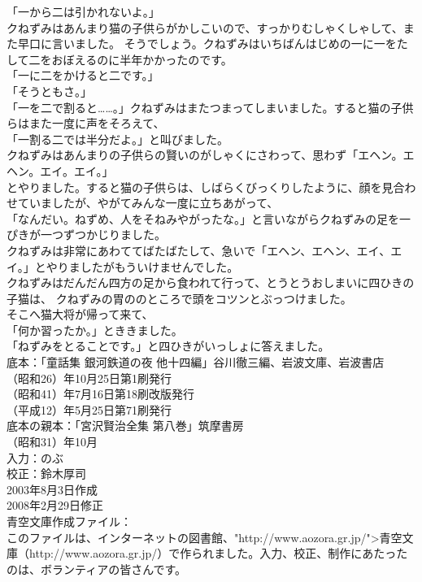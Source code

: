 \documentclass[
a4paper,
10pt,
book]
{tarticle}
\begin{document}
「一から二は引かれないよ。」\\
\indent クねずみはあんまり猫の子供らがかしこいので、すっかりむしゃくしゃして、また早口に言いました。
そうでしょう。クねずみはいちばんはじめの一に一をたして二をおぼえるのに半年かかったのです。\\
「一に二をかけると二です。」\\
「そうともさ。」\\
「一を二で割ると……。」クねずみはまたつまってしまいました。すると猫の子供らはまた一度に声をそろえて、\\
「一割る二では半分だよ。」と叫びました。\\
\indent クねずみはあんまりの子供らの賢いのがしゃくにさわって、思わず「エヘン。エヘン。エイ。エイ。」\\
とやりました。すると猫の子供らは、しばらくびっくりしたように、顔を見合わせていましたが、やがてみんな一度に立ちあがって、\\
「なんだい。ねずめ、人をそねみやがったな。」と言いながらクねずみの足を一ぴきが一つずつかじりました。\\
\indent クねずみは非常にあわててばたばたして、急いで「エヘン、エヘン、エイ、エイ。」とやりましたがもういけませんでした。\\
\indent クねずみはだんだん四方の足から食われて行って、とうとうおしまいに四ひきの子猫は、
クねずみの胃ののところで頭をコツンとぶっつけました。\\
\indent そこへ猫大将が帰って来て、\\
「何か習ったか。」とききました。\\
「ねずみをとることです。」と四ひきがいっしょに答えました。\\
\newpage
底本：「童話集 銀河鉄道の夜 他十四編」谷川徹三編、岩波文庫、岩波書店
\\
（昭和26）年10月25日第1刷発行\\
（昭和41）年7月16日第18刷改版発行\\
（平成12）年5月25日第71刷発行\\
底本の親本：「宮沢賢治全集 第八巻」筑摩書房\\
（昭和31）年10月\\
入力：のぶ\\
校正：鈴木厚司\\
2003年8月3日作成\\
2008年2月29日修正\\
青空文庫作成ファイル：\\
このファイルは、インターネットの図書館、"http://www.aozora.gr.jp/">青空文庫（http://www.aozora.gr.jp/）で作られました。入力、校正、制作にあたったのは、ボランティアの皆さんです。\\
\\
\begin{comment}
\end{comment}
\end{document}
